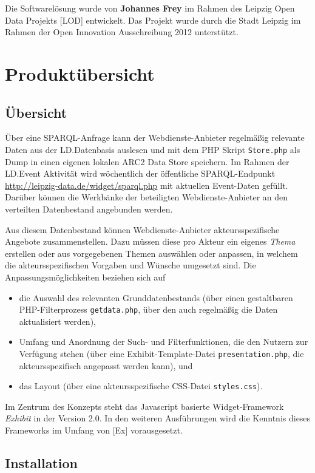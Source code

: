 \documentclass[11pt,a4paper]{article}
\begin{document}
Die Softwarelösung wurde von \textbf{Johannes Frey} im Rahmen des Leipzig Open
Data Projekts [LOD] entwickelt. Das Projekt wurde durch die Stadt Leipzig im
Rahmen der Open Innovation Ausschreibung 2012 unterstützt.

\section{Produktübersicht}

\subsection{Übersicht}

Über eine SPARQL-Anfrage kann der Webdienste-Anbieter regelmäßig relevante
Daten aus der LD.Datenbasis auslesen und mit dem PHP Skript \texttt{Store.php}
als Dump in einen eigenen lokalen ARC2 Data Store speichern. Im Rahmen der
LD.Event Aktivität wird wöchentlich der öffentliche SPARQL-Endpunkt
\url{http://leipzig-data.de/widget/sparql.php} mit aktuellen Event-Daten
gefüllt. Darüber können die {\glqq}Werkbänke{\grqq} der beteiligten
Webdienste-Anbieter an den verteilten Datenbestand angebunden werden.

Aus diesem Datenbestand können Webdienste-Anbieter akteursspezifische Angebote
zusammenstellen.  Dazu müssen diese pro Akteur ein eigenes \emph{Thema}
erstellen oder aus vorgegebenen Themen auswählen oder anpassen, in welchem die
akteursspezifischen Vorgaben und Wünsche umgesetzt sind.  Die
Anpassungsmöglichkeiten beziehen sich auf
\begin{itemize}
\item die Auswahl des relevanten Grunddatenbestands (über einen gestaltbaren
  PHP-Filter\-prozess \texttt{getdata.php}, über den auch regelmäßig die Daten
  aktualisiert werden),
\item Umfang und Anordnung der Such- und Filterfunktionen, die den Nutzern zur
  Verfügung stehen (über eine Exhibit-Template-Datei
  \texttt{presentation.php}, die akteursspezifisch angepasst werden kann), und
\item das Layout (über eine akteursspezifische CSS-Datei \texttt{styles.css}). 
\end{itemize}
Im Zentrum des Konzepts steht das Javascript basierte Widget-Framework
\emph{Exhibit} in der Version 2.0. In den weiteren Ausführungen wird die
Kenntnis dieses Frameworks im Umfang von [Ex] vorausgesetzt.

\subsection{Installation}
\end{document}
